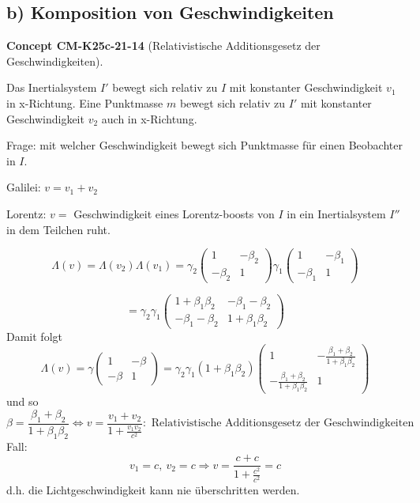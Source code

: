 \documentclass[10pt, letterpaper]{article}
\newcommand{\CustomHeading}[3]{%
  \par\medskip\noindent%
  \textbf{#1 #2} \textnormal{(#3)}.\enskip%
}
\newenvironment{CONC}[2]{\begin{unitbox}\CustomHeading{Concept}{#1}{#2}}{\end{unitbox}}
\begin{document}
\subsection*{b) Komposition von Geschwindigkeiten}


\begin{CONC}{CM-K25c-21-14}{Relativistische Additionsgesetz der Geschwindigkeiten}
Das Inertialsystem $I'$ bewegt sich relativ zu $I$ mit konstanter Geschwindigkeit $v_1$ in x-Richtung. Eine Punktmasse $m$ bewegt sich relativ zu $I'$ mit konstanter Geschwindigkeit $v_2$ auch in x-Richtung.

Frage: mit welcher Geschwindigkeit bewegt sich Punktmasse für einen Beobachter in $I$.

Galilei: $v = v_1 + v_2$

Lorentz: $v =$ Geschwindigkeit eines Lorentz-boosts von $I$ in ein Inertialsystem $I''$ in dem Teilchen ruht.

\[\Lambda(v) = \Lambda(v_2)\Lambda(v_1) = \gamma_2\begin{pmatrix} 1 & -\beta_2 \\ -\beta_2 & 1 \end{pmatrix}\gamma_1\begin{pmatrix} 1 & -\beta_1 \\ -\beta_1 & 1 \end{pmatrix}\]

\[= \gamma_2\gamma_1\begin{pmatrix} 1+\beta_1\beta_2 & -\beta_1-\beta_2 \\ -\beta_1-\beta_2 & 1+\beta_1\beta_2 \end{pmatrix}\]
Damit folgt
\[ \Lambda(v) = \gamma\begin{pmatrix} 1 & -\beta \\ -\beta & 1 \end{pmatrix} = \gamma_2\gamma_1(1+\beta_1\beta_2)\begin{pmatrix} 1 & -\frac{\beta_1+\beta_2}{1+\beta_1\beta_2} \\ -\frac{\beta_1+\beta_2}{1+\beta_1\beta_2} & 1 \end{pmatrix}\]
und so
\[ \beta = \frac{\beta_1+\beta_2}{1+\beta_1\beta_2} \Leftrightarrow v = \frac{v_1+v_2}{1+\frac{v_1v_2}{c^2}} : \text{ Relativistische Additionsgesetz der Geschwindigkeiten}
\]
Fall: 
$$v_1 = c,\ v_2 = c \Rightarrow v = \frac{c+c}{1+\frac{c^2}{c^2}} = c$$ 
d.h. die Lichtgeschwindigkeit kann nie überschritten werden.
\end{CONC}
\end{document}
